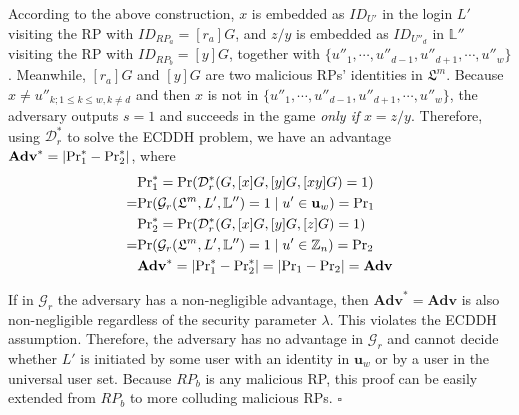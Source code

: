 According to the above construction, %
$x$ is embedded as $ID_{U'}$ in the login $L'$ visiting the RP with $ID_{RP_{a}} = [r_{a}]G$,
and $z/y$ is embedded as $ID_{U''_d}$ in $\mathbb{L}''$ visiting the RP with $ID_{RP_{b}}=[y]G$,
together with $\{u''_1, \cdots, u''_{d-1}, u''_{d+1}, \cdots, u''_w\}$.
Meanwhile, $[r_{a}]G$ and $[y]G$ are two malicious RPs' identities in $\mathfrak{L}^m$.
Because $x \neq u''_{k; 1\leq k \leq w, k \neq d}$ and then $x$ is not in $\{u''_1, \cdots, u''_{d-1}, u''_{d+1}, \cdots, u''_w\}$, the adversary outputs $s=1$ and succeeds in the game \emph{only if} $x = z/y$.
 Therefore, using $\mathcal{D}^*_r$ to solve the ECDDH problem, we have an advantage $\mathbf{Adv}^*=|{\rm Pr}^*_1 - {\rm Pr}^*_2|$, where
\begin{align*}
&{\rm Pr}^*_1 =  {\rm Pr}(\mathcal{D}^*_r(G, [x]G, [y]G, [xy]G)=1) \\
=&{\rm Pr}(\mathcal{G}_r(\mathfrak{L}^m, L', \mathbb{L}'')=1 \; | \; u' \in \mathbf{u}_w) = {\rm Pr}_1 \\
&{\rm Pr}^*_2= {\rm Pr}(\mathcal{D}^*_r(G, [x]G, [y]G, [z]G)=1) \\
=&{\rm Pr}(\mathcal{G}_r(\mathfrak{L}^m, L', \mathbb{L}'')=1 \; | \; u' \in \mathbb{Z}_n) = {\rm Pr}_2 \\
&\mathbf{Adv}^*=|{\rm Pr}^*_1-{\rm Pr}^*_2|=|{\rm Pr}_1-{\rm Pr}_2|={\mathbf{Adv}}
\end{align*}

If in $\mathcal{G}_r$ the adversary has a non-negligible advantage, then $\mathbf{Adv}^*={\mathbf{Adv}}$ is also non-negligible regardless of the security parameter $\lambda$. This violates the ECDDH assumption. Therefore, the adversary has no advantage in $\mathcal{G}_r$ and cannot decide whether $L'$ is initiated by some user with an identity in $\mathbf{u}_w$ or by a user in the universal user set.
Because $RP_b$ is any malicious RP, this proof can be easily extended from $RP_b$ to more colluding malicious RPs.
\hfill $\square$


